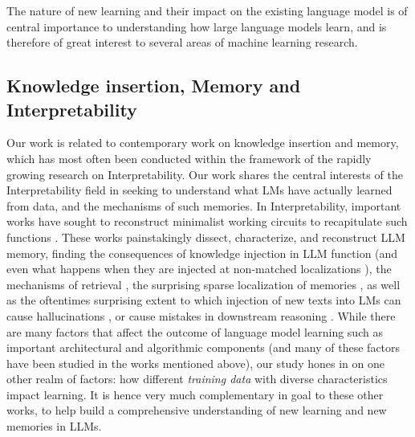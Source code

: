 \documentclass[11pt, a4paper, logo, copyright]{googledeepmind}
\theoremstyle{plain}
\theoremstyle{definition}
\theoremstyle{remark}
\begin{document}
The nature of new learning and their impact on the existing language model is of central importance to understanding how large language models learn, and is therefore of great interest to several areas of machine learning research. 


\subsection{Knowledge insertion, Memory and Interpretability}
Our work is related to contemporary work on knowledge insertion and memory, which has most often been conducted within the framework of the rapidly growing research on Interpretability. Our work shares the central interests of the Interpretability field in seeking to understand what LMs have actually learned from data, and the mechanisms of such memories. In Interpretability, important works have sought to reconstruct minimalist working circuits to recapitulate such functions \citep{memory1,memory2,memory3, memory4, memory_neel,patchscope}. These works painstakingly dissect, characterize, and reconstruct LLM memory, finding the consequences of knowledge injection in LLM function (and even what happens when they are injected at non-matched localizations \citep{locality}), the mechanisms of retrieval \citep{memory_neel,memory4}, the surprising sparse localization of memories \citep{bau1,bau2}, as well as the oftentimes surprising extent to which injection of new texts into LMs can cause hallucinations \citep{hallu_FT, hallu1, hallu2, hallu_review}, or cause mistakes in downstream reasoning \citep{hallu_review, geva_KE_dataset}. While there are many factors that affect the outcome of language model learning such as important architectural and algorithmic components (and many of these factors have been studied in the works mentioned above), our study hones in on one other realm of factors: how different \textit{training data} with diverse characteristics impact learning. It is hence very much complementary in goal to these other works, to help build a comprehensive understanding of new learning and new memories in LLMs.

 
\end{document}
